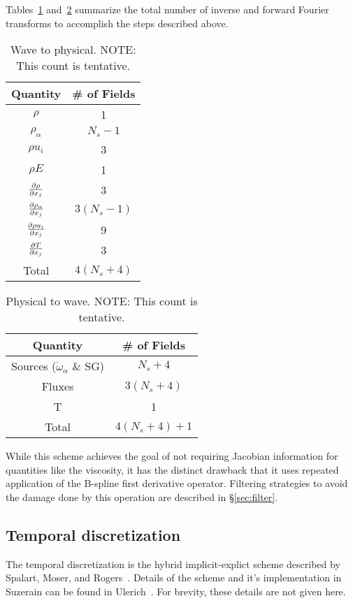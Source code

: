 Tables~\ref{tbl:w2p} and~\ref{tbl:p2w} summarize the total number of
inverse and forward Fourier transforms to accomplish the steps
described above.
%
\begin{table}[ht]
\caption{Wave to physical.  NOTE: This count is tentative.}
\begin{tabular}{|c|c|}
\hline
Quantity & \# of Fields \\
\hline
\hline
$\rho$ & 1 \\
$\rho_{\alpha}$ & $N_s - 1$ \\
$\rho u_i$ & 3 \\
$\rho E$ & 1 \\
$\frac{\partial \rho}{\partial x_j}$ & 3 \\
$\frac{\partial \rho_{\alpha}}{\partial x_j}$ & $3 (N_s - 1)$ \\
$\frac{\partial \rho u_i}{\partial x_j}$ & 9 \\
$\frac{\partial T}{\partial x_j}$ & 3 \\
\hline
Total & $4(N_s + 4)$\\
\hline
\end{tabular}
\label{tbl:w2p}
\end{table}
% 
%
\begin{table}[ht]
\caption{Physical to wave.  NOTE: This count is tentative.}
\begin{tabular}{|c|c|}
\hline
Quantity & \# of Fields \\
\hline
\hline
Sources ($\dot{\omega}_{\alpha}$ \& SG) & $N_s + 4$ \\
Fluxes & $3 (N_s +4)$ \\
T & 1 \\
\hline
Total & $4(N_s + 4) + 1$\\
\hline
\end{tabular}
\label{tbl:p2w}
\end{table}
% 

While this scheme achieves the goal of not requiring Jacobian
information for quantities like the viscosity, it has the distinct
drawback that it uses repeated application of the B-spline first
derivative operator.  Filtering strategies to avoid the damage done by
this operation are described in \S\ref{sec:filter}.


\subsection{Temporal discretization}
\label{sec:temporal_discretization}
The temporal discretization is the hybrid implicit-explict scheme
described by Spalart, Moser, and Rogers~\cite{spalart_lowstoragerk}.
Details of the scheme and it's implementation in Suzerain can be found
in Ulerich~\cite{?}.  For brevity, these details are not given here.

